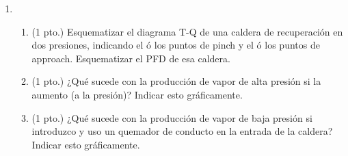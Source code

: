 \documentclass[10pt,a4paper]{article}
\begin{document}
\begin{enumerate}
        \item
        \begin{enumerate}
            \item (1 pto.) Esquematizar el diagrama T-Q de una caldera de recuperación en dos presiones, indicando el ó los puntos de pinch y el ó los puntos de approach. Esquematizar el PFD de esa caldera.

            \item (1 pto.) ¿Qué sucede con la producción de vapor de alta presión si la aumento (a la presión)? Indicar esto gráficamente.

            \item (1 pto.) ¿Qué sucede con la producción de vapor de baja presión si introduzco y uso un quemador de conducto en la entrada de la caldera? Indicar esto gráficamente.
        \end{enumerate}  
\end{enumerate}
\end{document}
